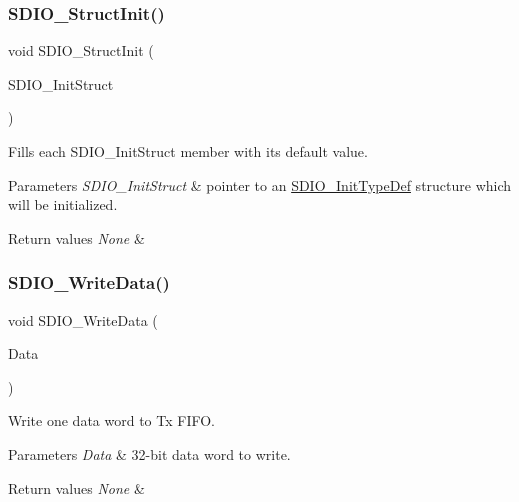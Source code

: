 \subsubsection{\texorpdfstring{SDIO\_StructInit()}{SDIO\_StructInit()}}
{\footnotesize\ttfamily void S\+D\+I\+O\+\_\+\+Struct\+Init (\begin{DoxyParamCaption}\item[{\mbox{\hyperlink{struct_s_d_i_o___init_type_def}{S\+D\+I\+O\+\_\+\+Init\+Type\+Def}} $\ast$}]{S\+D\+I\+O\+\_\+\+Init\+Struct }\end{DoxyParamCaption})}



Fills each S\+D\+I\+O\+\_\+\+Init\+Struct member with its default value. 


\begin{DoxyParams}{Parameters}
{\em S\+D\+I\+O\+\_\+\+Init\+Struct} & pointer to an \mbox{\hyperlink{struct_s_d_i_o___init_type_def}{S\+D\+I\+O\+\_\+\+Init\+Type\+Def}} structure which will be initialized. \\
\hline
\end{DoxyParams}

\begin{DoxyRetVals}{Return values}
{\em None} & \\
\hline
\end{DoxyRetVals}
\mbox{\label{group___s_d_i_o___exported___functions_ga361008b5252aa33b5f2b5823ee3d7240}} 
\subsubsection{\texorpdfstring{SDIO\_WriteData()}{SDIO\_WriteData()}}
{\footnotesize\ttfamily void S\+D\+I\+O\+\_\+\+Write\+Data (\begin{DoxyParamCaption}\item[{uint32\+\_\+t}]{Data }\end{DoxyParamCaption})}



Write one data word to Tx F\+I\+FO. 


\begin{DoxyParams}{Parameters}
{\em Data} & 32-\/bit data word to write. \\
\hline
\end{DoxyParams}

\begin{DoxyRetVals}{Return values}
{\em None} & \\
\hline
\end{DoxyRetVals}
